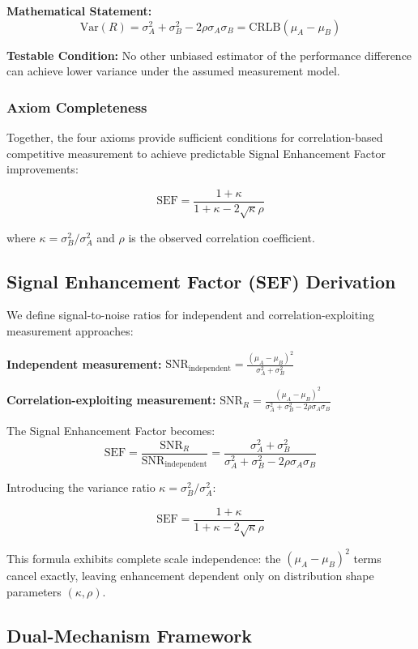 \textbf{Mathematical Statement:}
$$\text{Var}(R) = \sigma_A^2 + \sigma_B^2 - 2\rho\sigma_A\sigma_B = \text{CRLB}(\mu_A - \mu_B)$$

\textbf{Testable Condition:} No other unbiased estimator of the performance difference can achieve lower variance under the assumed measurement model.

\subsubsection{Axiom Completeness}
Together, the four axioms provide sufficient conditions for correlation-based competitive measurement to achieve predictable Signal Enhancement Factor improvements:

$$\text{SEF} = \frac{1 + \kappa}{1 + \kappa - 2\sqrt{\kappa}\rho}$$

where $\kappa = \sigma_B^2/\sigma_A^2$ and $\rho$ is the observed correlation coefficient.

\subsection{Signal Enhancement Factor (SEF) Derivation}

We define signal-to-noise ratios for independent and correlation-exploiting measurement approaches:

\textbf{Independent measurement:} $\text{SNR}_{\text{independent}} = \frac{(\mu_A - \mu_B)^2}{\sigma_A^2 + \sigma_B^2}$

\textbf{Correlation-exploiting measurement:} $\text{SNR}_R = \frac{(\mu_A - \mu_B)^2}{\sigma_A^2 + \sigma_B^2 - 2\rho\sigma_A\sigma_B}$

The Signal Enhancement Factor becomes:
$$\text{SEF} = \frac{\text{SNR}_R}{\text{SNR}_{\text{independent}}} = \frac{\sigma_A^2 + \sigma_B^2}{\sigma_A^2 + \sigma_B^2 - 2\rho\sigma_A\sigma_B}$$

Introducing the variance ratio $\kappa = \sigma_B^2/\sigma_A^2$:

$$\text{SEF} = \frac{1 + \kappa}{1 + \kappa - 2\sqrt{\kappa}\rho}$$

This formula exhibits complete scale independence: the $(\mu_A - \mu_B)^2$ terms cancel exactly, leaving enhancement dependent only on distribution shape parameters $(\kappa, \rho)$.

\subsection{Dual-Mechanism Framework}

